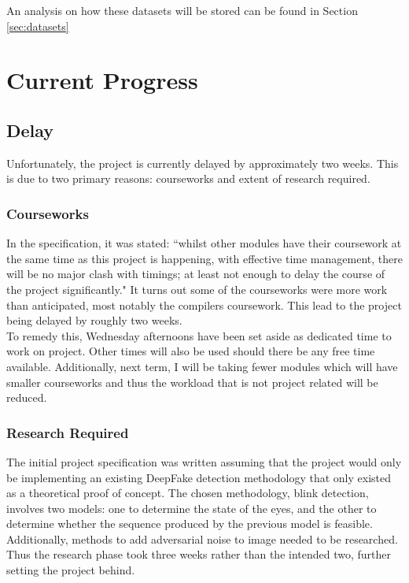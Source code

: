 \documentclass{article}
\begin{document}
An analysis on how these datasets will be stored can be found in Section \ref{sec:datasets}

\section{Current Progress}

\subsection{Delay} \label{sec:delay}

Unfortunately, the project is currently delayed by approximately two weeks. This is due to two primary reasons: courseworks and extent of research required.

\subsubsection{Courseworks}

In the specification, it was stated: ``whilst other modules have their coursework at the same time as this project is happening, with effective time management, there will be no major clash with timings; at least not enough to delay the course of the project significantly." It turns out some of the courseworks were more work than anticipated, most notably the compilers coursework. This lead to the project being delayed by roughly two weeks.\\

To remedy this, Wednesday afternoons have been set aside as dedicated time to work on project. Other times will also be used should there be any free time available. Additionally, next term, I will be taking fewer modules which will have smaller courseworks and thus the workload that is not project related will be reduced.

\subsubsection{Research Required}

The initial project specification was written assuming that the project would only be implementing an existing DeepFake detection methodology that only existed as a theoretical proof of concept. The chosen methodology, blink detection, involves two models: one to determine the state of the eyes, and the other to determine whether the sequence produced by the previous model is feasible. Additionally, methods to add adversarial noise to image needed to be researched. Thus the research phase took three weeks rather than the intended two, further setting the project behind.
\end{document}
